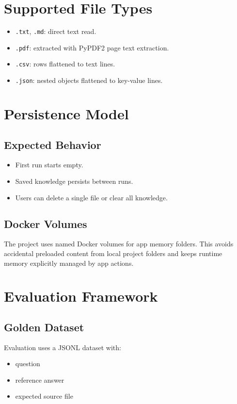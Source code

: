 \documentclass[11pt,a4paper]{article}
\begin{document}
\section{Supported File Types}
\begin{itemize}[leftmargin=*]
\item \texttt{.txt}, \texttt{.md}: direct text read.
\item \texttt{.pdf}: extracted with PyPDF2 page text extraction.
\item \texttt{.csv}: rows flattened to text lines.
\item \texttt{.json}: nested objects flattened to key-value lines.
\end{itemize}

\section{Persistence Model}
\subsection{Expected Behavior}
\begin{itemize}[leftmargin=*]
\item First run starts empty.
\item Saved knowledge persists between runs.
\item Users can delete a single file or clear all knowledge.
\end{itemize}

\subsection{Docker Volumes}
The project uses named Docker volumes for app memory folders. This avoids accidental preloaded content from local project folders and keeps runtime memory explicitly managed by app actions.

\section{Evaluation Framework}
\subsection{Golden Dataset}
Evaluation uses a JSONL dataset with:
\begin{itemize}[leftmargin=*]
\item question
\item reference answer
\item expected source file
\end{itemize}
\end{document}
